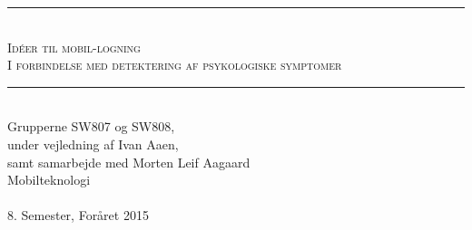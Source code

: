 
\setcounter{secnumdepth}{1}


\begin{titlepage}

\begin{center}
\newcommand{\HRule}{\rule{\linewidth}{0.5mm}}
\HRule \\[0.4cm]
\textsc{ \Huge Idéer til mobil-logning \\[0.2cm]
\large I forbindelse med detektering af psykologiske symptomer}\\[0.4cm]

\HRule \\[1cm]

{\Large Grupperne SW807 og SW808,\\
under vejledning af Ivan Aaen,\\
samt samarbejde med Morten Leif Aagaard} \\[2cm]

\vfill
{\Large Mobilteknologi}
\\ ~\\
{\large 8. Semester, Foråret 2015}

\end{center}
\end{titlepage}


\newpage

\newpage

\newpage

\newpage

\newpage

\newpage

\newpage

\newpage

\newpage

\newpage

\newpage


\newpage


